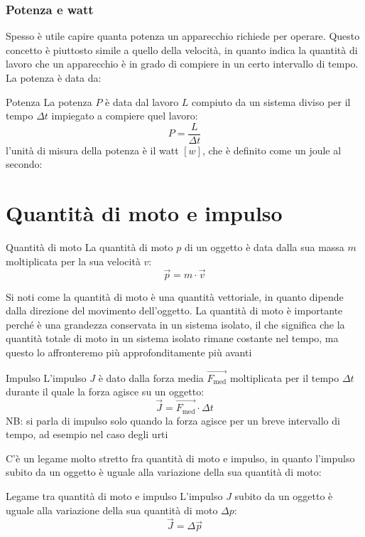 \subsubsection{Potenza e watt}
Spesso è utile capire quanta potenza un apparecchio richiede per operare. Questo concetto è piuttosto simile a quello della velocità, in quanto indica la quantità di lavoro che un apparecchio è in grado di compiere in un certo intervallo di tempo. La potenza è data da:
\begin{definizione}{Potenza}
	La potenza $ P $ è data dal lavoro $ L $ compiuto da un sistema diviso per il tempo $ \Delta t $ impiegato a compiere quel lavoro:
	\[
		P = \frac{L}{\Delta t}
	\]
	l'unità di misura della potenza è il watt $ \left[w\right] $, che è definito come un joule al secondo:
\end{definizione}
\section{Quantità di moto e impulso}
\begin{definizione}{Quantità di moto}
	La quantità di moto $ p $ di un oggetto è data dalla sua massa $ m $ moltiplicata per la sua velocità $ v $:
	\[
		\vec{p}  = m \cdot \vec{v}
	\]
\end{definizione}
Si noti come la quantità di moto è una quantità vettoriale, in quanto dipende dalla direzione del movimento dell'oggetto. La quantità di moto è importante perché è una grandezza conservata in un sistema isolato, il che significa che la quantità totale di moto in un sistema isolato rimane costante nel tempo, ma questo lo affronteremo più approfonditamente più avanti
\begin{definizione}{Impulso}
	L'impulso $ J $ è dato dalla forza media $ \vec{F_{\text{med}}} $ moltiplicata per il tempo $ \Delta t $ durante il quale la forza agisce su un oggetto:
	\[
		\vec{J}=\vec{F_{\text{med}}} \cdot \Delta t
	\]
	NB: si parla di impulso solo quando la forza agisce per un breve intervallo di tempo, ad esempio nel caso degli urti
\end{definizione}
C'è un legame molto stretto fra quantità di moto e impulso, in quanto l'impulso subito da un oggetto è uguale alla variazione della sua quantità di moto:
\begin{teorema}{Legame tra quantità di moto e impulso}
	L'impulso $ J $ subito da un oggetto è uguale alla variazione della sua quantità di moto $ \Delta p $:
	\[
		\vec{J} = \Delta \vec{p}
	\]
\end{teorema}

